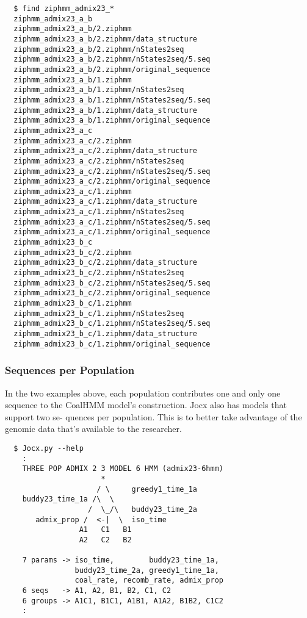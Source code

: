 {\begin{verbatim}
  $ find ziphmm_admix23_*
  ziphmm_admix23_a_b
  ziphmm_admix23_a_b/2.ziphmm
  ziphmm_admix23_a_b/2.ziphmm/data_structure
  ziphmm_admix23_a_b/2.ziphmm/nStates2seq
  ziphmm_admix23_a_b/2.ziphmm/nStates2seq/5.seq
  ziphmm_admix23_a_b/2.ziphmm/original_sequence
  ziphmm_admix23_a_b/1.ziphmm
  ziphmm_admix23_a_b/1.ziphmm/nStates2seq
  ziphmm_admix23_a_b/1.ziphmm/nStates2seq/5.seq
  ziphmm_admix23_a_b/1.ziphmm/data_structure
  ziphmm_admix23_a_b/1.ziphmm/original_sequence
  ziphmm_admix23_a_c
  ziphmm_admix23_a_c/2.ziphmm
  ziphmm_admix23_a_c/2.ziphmm/data_structure
  ziphmm_admix23_a_c/2.ziphmm/nStates2seq
  ziphmm_admix23_a_c/2.ziphmm/nStates2seq/5.seq
  ziphmm_admix23_a_c/2.ziphmm/original_sequence
  ziphmm_admix23_a_c/1.ziphmm
  ziphmm_admix23_a_c/1.ziphmm/data_structure
  ziphmm_admix23_a_c/1.ziphmm/nStates2seq
  ziphmm_admix23_a_c/1.ziphmm/nStates2seq/5.seq
  ziphmm_admix23_a_c/1.ziphmm/original_sequence
  ziphmm_admix23_b_c
  ziphmm_admix23_b_c/2.ziphmm
  ziphmm_admix23_b_c/2.ziphmm/data_structure
  ziphmm_admix23_b_c/2.ziphmm/nStates2seq
  ziphmm_admix23_b_c/2.ziphmm/nStates2seq/5.seq
  ziphmm_admix23_b_c/2.ziphmm/original_sequence
  ziphmm_admix23_b_c/1.ziphmm
  ziphmm_admix23_b_c/1.ziphmm/nStates2seq
  ziphmm_admix23_b_c/1.ziphmm/nStates2seq/5.seq
  ziphmm_admix23_b_c/1.ziphmm/data_structure
  ziphmm_admix23_b_c/1.ziphmm/original_sequence
\end{verbatim}}

\subsubsection{Sequences per Population} In the two examples above, each
population contributes one and only one sequence to the CoalHMM model’s
construction. Jocx also has models that support two se- quences per population.
This is to better take advantage of the genomic data that’s available to the
researcher.

{\small{}\begin{verbatim}
  $ Jocx.py --help
    :
    THREE POP ADMIX 2 3 MODEL 6 HMM (admix23-6hmm)
                      *
                     / \     greedy1_time_1a
    buddy23_time_1a /\  \
                   /  \_/\   buddy23_time_2a
       admix_prop /  <-|  \  iso_time
                 A1   C1   B1
                 A2   C2   B2

    7 params -> iso_time,        buddy23_time_1a,
                buddy23_time_2a, greedy1_time_1a,
                coal_rate, recomb_rate, admix_prop
    6 seqs   -> A1, A2, B1, B2, C1, C2
    6 groups -> A1C1, B1C1, A1B1, A1A2, B1B2, C1C2
    :
\end{verbatim}}

